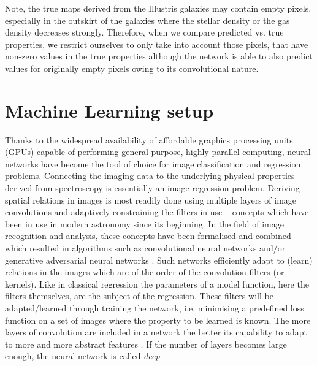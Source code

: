 \documentclass[useAMS,usenatbib]{mnras}
\begin{document}
Note, the true maps derived from the Illustris galaxies may contain empty pixels, especially in the outskirt of the galaxies where the stellar density or the gas density decreases strongly. Therefore, when we compare predicted vs. true properties, we restrict ourselves to only take into account those pixels, that have non-zero values in the true properties although the network is able to also predict values for originally empty pixels owing to its convolutional nature.  

\section{Machine Learning setup} \label{subsec:ML}

Thanks to the widespread availability of affordable graphics processing units (GPUs) capable of performing general purpose, highly parallel computing, neural networks have become the tool of choice for image classification and regression problems. Connecting the imaging data to the underlying physical properties derived from spectroscopy is essentially an image regression problem. Deriving spatial relations in images is most readily done using multiple layers of image convolutions and adaptively constraining the filters in use \citep[see e.g.][]{Krizhevsky2012} -- concepts which have been in use in modern astronomy since its beginning. 
In the field of image recognition and analysis, these concepts have been formalised and combined which resulted in algorithms such as convolutional neural networks \citep[CNN][]{CNN2015} and/or generative adversarial neural networks \citep{Goodfellow2014}. Such networks efficiently adapt to (learn) relations in the images which are of the order of the convolution filters (or kernels). Like in classical regression the parameters of a model function, here the filters themselves, are the subject of the regression. These filters will be adapted/learned through training the network, i.e. minimising a predefined loss function on a set of images where the property to be learned is known. The more layers of convolution are included in a network the better its capability to adapt to more and more abstract features \citep{Zeiler2014}. If the number of layers becomes large enough, the neural network is called \textit{deep}.
\end{document}
